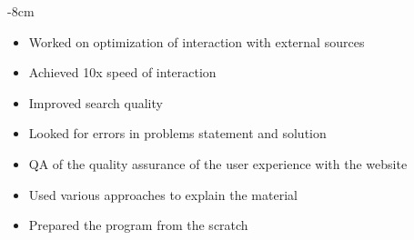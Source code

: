 \documentclass[10pt,a4paper]{altacv}
\begin{document}

\begin{adjustwidth}{}{-8cm}
\makecvheader
\end{adjustwidth}


\begin{itemize}
\item Worked on optimization of interaction with external sources
\item Achieved 10x speed of interaction
\item Improved search quality
\end{itemize}
   
\divider

\begin{itemize}
\item Looked for errors in problems statement and solution
\item QA of the quality assurance of the user experience with the website
\end{itemize}
\divider

\begin{itemize}
\item Used various approaches to explain the material
\item Prepared the program  from the scratch
\end{itemize}
\end{document}
